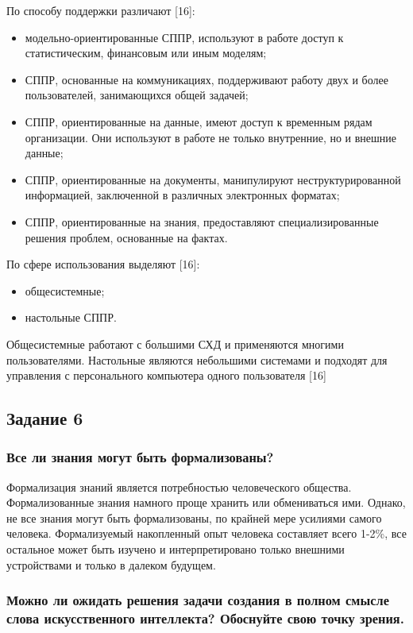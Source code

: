 \documentclass[14pt,a4paper,report]{report}
\begin{document}
По способу поддержки различают [16]:

\begin{itemize}
	\item модельно-ориентированные СППР, используют в работе доступ к статистическим, финансовым или иным моделям;
	\item СППР, основанные на коммуникациях, поддерживают работу двух и более пользователей, занимающихся общей задачей;
	\item СППР, ориентированные на данные, имеют доступ к временным рядам организации. Они используют в работе не только внутренние, но и внешние данные;
	\item СППР, ориентированные на документы, манипулируют неструктурированной информацией, заключенной в различных электронных форматах;
	\item СППР, ориентированные на знания, предоставляют специализированные решения проблем, основанные на фактах.
\end{itemize}	
	
По сфере использования выделяют [16]:

\begin{itemize}
	\item общесистемные;
	\item настольные СППР.
\end{itemize}

Общесистемные работают с большими СХД и применяются многими пользователями. Настольные являются небольшими системами и подходят для управления с персонального компьютера одного пользователя [16]

\subsection{Задание 6}

\subsubsection{Все ли знания могут быть формализованы?}

Формализация знаний является потребностью человеческого общества. Формализованные знания намного проще хранить или обмениваться ими. Однако, не все знания могут быть формализованы, по крайней мере усилиями самого человека. Формализуемый накопленный опыт человека составляет всего 1-2\%, все остальное может быть изучено и интерпретировано только внешними устройствами и только в далеком будущем.

\subsubsection{Можно ли ожидать решения задачи создания в полном смысле слова искусственного интеллекта? Обоснуйте свою точку зрения.}
\end{document}
